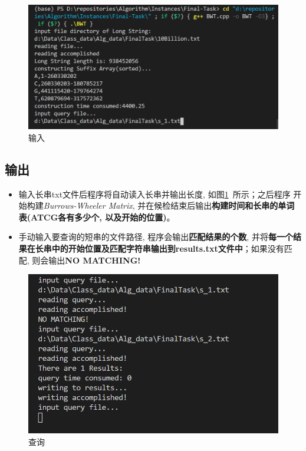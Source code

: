 \documentclass[UTF8]{ctexart}
\newcommand{\reff}[1]{图\ref{#1}\ }
\begin{document}
    \begin{figure}[H]
        \label{fig1}
        \centering
        \includegraphics[width=12cm]{resources/ft_input.png}
        \caption{输入}
    \end{figure}
    \subsection{输出}
    \begin{itemize}
        \item 输入长串txt文件后程序将自动读入长串并输出长度, 如\reff{fig1}所示；之后程序
        开始构建\emph{Burrows-Wheeler Matrix}, 并在候检结束后输出\textbf{构建时间和长串的单词表(ATCG各有多少个, 以及开始的位置)}。
        \item 手动输入要查询的短串的文件路径, 程序会输出\textbf{匹配结果的个数}, 并将\textbf{每一个结果在长串中的开始位置及匹配字符串输出到results.txt文件中}；如果没有匹配, 则会输出\textbf{NO MATCHING!}
    \end{itemize}
    \begin{figure}[H]
        \centering
        \label{fig2}
        \includegraphics[width=12cm]{resources/ft_output.png}
        \caption{查询}
    \end{figure}
\end{document}
